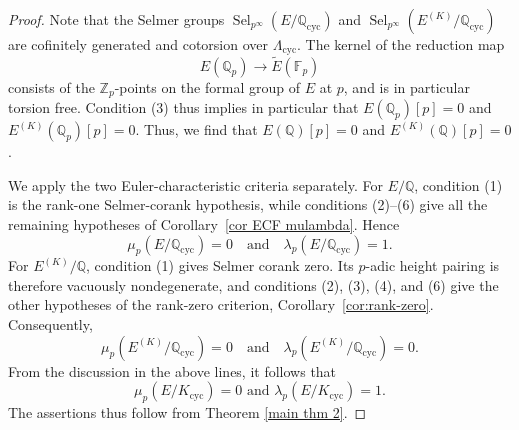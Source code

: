 \documentclass[12pt]{amsart}
\newtheorem{theorem}{Theorem}[section]
\newcommand{\Z}{\mathbb{Z}}
\newcommand{\Q}{\mathbb{Q}}
\newcommand{\F}{\mathbb{F}}
\newcommand{\op}[1]{\operatorname{#1}}
\numberwithin{equation}{section}
\begin{document}
\begin{proof}
    Note that the Selmer groups $\op{Sel}_{p^\infty}(E/\Q_{\op{cyc}})$ and $\op{Sel}_{p^\infty}(E^{(K)}/\Q_{\op{cyc}})$ are cofinitely generated and cotorsion over $\Lambda_{\op{cyc}}$. The kernel of the reduction map \[E(\Q_p)\rightarrow \widetilde{E}(\F_p)\]
    consists of the $\Z_p$-points on the formal group of $E$ at $p$, and is in particular torsion free. Condition (3) thus implies in particular that $E(\Q_p)[p]=0$ and $E^{(K)}(\Q_p)[p]=0$. Thus, we find that $E(\Q)[p]=0$ and $E^{(K)}(\Q)[p]=0$.

    We apply the two Euler-characteristic criteria separately. For $E/\Q$, condition (1) is the rank-one Selmer-corank hypothesis, while conditions (2)--(6) give all the remaining hypotheses of Corollary~\ref{cor ECF mulambda}. Hence
    \[
        \mu_p(E/\Q_{\op{cyc}})=0
        \quad\text{and}\quad
        \lambda_p(E/\Q_{\op{cyc}})=1.
    \]
    For $E^{(K)}/\Q$, condition (1) gives Selmer corank zero. Its $p$-adic height pairing is therefore vacuously nondegenerate, and conditions (2), (3), (4), and (6) give the other hypotheses of the rank-zero criterion, Corollary~\ref{cor:rank-zero}. Consequently,
    \[
        \mu_p(E^{(K)}/\Q_{\op{cyc}})=0
        \quad\text{and}\quad
        \lambda_p(E^{(K)}/\Q_{\op{cyc}})=0.
    \]
From the discussion in the above lines, it follows that 
\[\mu_p(E/K_{\op{cyc}})=0\text{ and } \lambda_p(E/K_{\op{cyc}})=1.\]
The assertions thus follow from Theorem \ref{main thm 2}.
\end{proof}
\end{document}
